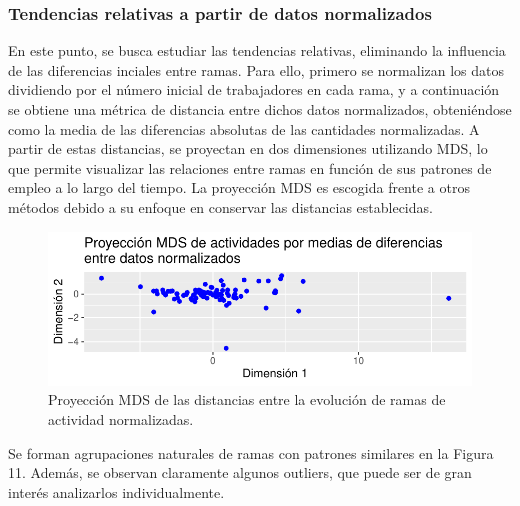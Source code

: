 \documentclass[Universitat de
València,article,submit,moreauthors,pdftex]{Definitions/mdpi}
\begin{document}
\subsubsection{\texorpdfstring{\textbf{Tendencias relativas a partir de
datos
normalizados}}{Tendencias relativas a partir de datos normalizados}}\label{tendencias-relativas-a-partir-de-datos-normalizados}

En este punto, se busca estudiar las tendencias relativas, eliminando la
influencia de las diferencias inciales entre ramas. Para ello, primero
se normalizan los datos dividiendo por el número inicial de trabajadores
en cada rama, y a continuación se obtiene una métrica de distancia entre
dichos datos normalizados, obteniéndose como la media de las diferencias
absolutas de las cantidades normalizadas. A partir de estas distancias,
se proyectan en dos dimensiones utilizando MDS, lo que permite
visualizar las relaciones entre ramas en función de sus patrones de
empleo a lo largo del tiempo. La proyección MDS es escogida frente a
otros métodos debido a su enfoque en conservar las distancias
establecidas.

\begin{figure}

{\centering \includegraphics{ProyectoAED2024_files/figure-latex/unnamed-chunk-42-1} 

}

\caption{Proyección MDS de las distancias entre la evolución de ramas de actividad normalizadas.}\label{fig:unnamed-chunk-42}
\end{figure}

Se forman agrupaciones naturales de ramas con patrones similares en la
Figura 11. Además, se observan claramente algunos outliers, que puede
ser de gran interés analizarlos individualmente.
\end{document}
